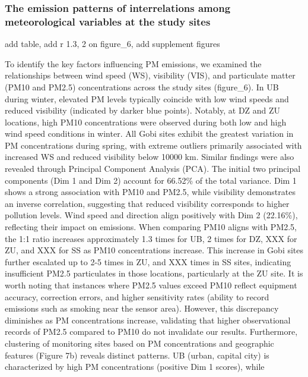 \documentclass[
  11pt,
]{article}
\begin{document}
\subsubsection{The emission patterns of interrelations among
meteorological variables at the study
sites}\label{the-emission-patterns-of-interrelations-among-meteorological-variables-at-the-study-sites}

add table, add r 1.3, 2 on figure\_6, add supplement figures

To identify the key factors influencing PM emissions, we examined the
relationships between wind speed (WS), visibility (VIS), and particulate
matter (PM10 and PM2.5) concentrations across the study sites
(figure\_6). In UB during winter, elevated PM levels typically coincide
with low wind speeds and reduced visibility (indicated by darker blue
points). Notably, at DZ and ZU locations, high PM10 concentrations were
observed during both low and high wind speed conditions in winter. All
Gobi sites exhibit the greatest variation in PM concentrations during
spring, with extreme outliers primarily associated with increased WS and
reduced visibility below 10000 km. Similar findings were also revealed
through Principal Component Analysis (PCA). The initial two principal
components (Dim 1 and Dim 2) account for 66.52\% of the total variance.
Dim 1 shows a strong association with PM10 and PM2.5, while visibility
demonstrates an inverse correlation, suggesting that reduced visibility
corresponds to higher pollution levels. Wind speed and direction align
positively with Dim 2 (22.16\%), reflecting their impact on emissions.
When comparing PM10 aligns with PM2.5, the 1:1 ratio increases
approximately 1.3 times for UB, 2 times for DZ, XXX for ZU, and XXX for
SS as PM10 concentrations increase. This increase in Gobi sites further
escalated up to 2-5 times in ZU, and XXX times in SS sites, indicating
insufficient PM2.5 particulates in those locations, particularly at the
ZU site. It is worth noting that instances where PM2.5 values exceed
PM10 reflect equipment accuracy, correction errors, and higher
sensitivity rates (ability to record emissions such as smoking near the
sensor area). However, this discrepancy diminishes as PM concentrations
increase, validating that higher observational records of PM2.5 compared
to PM10 do not invalidate our results. Furthermore, clustering of
monitoring sites based on PM concentrations and geographic features
(Figure 7b) reveals distinct patterns. UB (urban, capital city) is
characterized by high PM concentrations (positive Dim 1 scores), while
\end{document}
